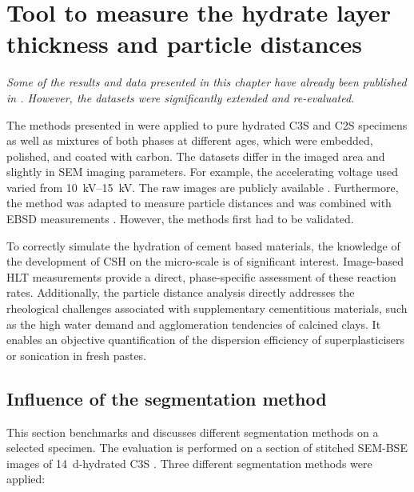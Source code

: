 \chapter{Tool to measure the hydrate layer thickness and particle distances}
\label{chap:hydrate-rim}

\textit{Some of the results and data presented in this chapter have already been published in \cite{kleiner.2024a,kleiner.2026b}. However, the datasets were significantly extended and re-evaluated.}

The methods presented in  were applied to pure hydrated \ac{C3S} and \ac{C2S} specimens as well as mixtures of both phases at different ages, which were embedded, polished, and coated with carbon.
The datasets differ in the imaged area and slightly in \ac{SEM} imaging parameters.
For example, the accelerating voltage used varied from \qtyrange{10}{15}{\kilo\volt}.
The raw images are publicly available \cite{kleiner.2023a, kleiner.2025e, kleiner.2025d}.
Furthermore, the method was adapted to measure particle distances and was combined with \ac{EBSD} measurements \cite{kleiner.2026a}.
However, the methods first had to be validated.

To correctly simulate the hydration of cement based materials, the knowledge of the development of \ac{CSH} on the micro-scale is of significant interest.
Image-based \ac{HLT} measurements provide a direct, phase-specific assessment of these reaction rates.
Additionally, the particle distance analysis directly addresses the rheological challenges associated with supplementary cementitious materials, such as the high water demand and agglomeration tendencies of calcined clays.
It enables an objective quantification of the dispersion efficiency of superplasticisers or sonication in fresh pastes.



\section{Influence of the segmentation method}

This section benchmarks and discusses different segmentation methods on a selected specimen.
The evaluation is performed on a  section of stitched \ac{SEM}-\ac{BSE} images of \qty{14}{\day}-hydrated \ac{C3S} \cite{kleiner.2024a}.
Three different segmentation methods were applied:

